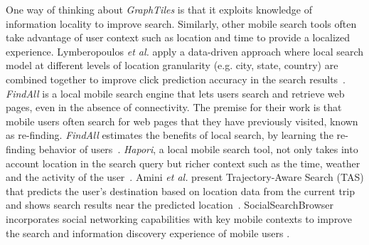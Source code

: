 


One way of thinking about \textit{GraphTiles} is that it exploits knowledge of information locality to improve search. Similarly, other mobile search tools often take advantage of user context such as location and time to provide a localized experience. Lymberopoulos \textit{et al.} apply a data-driven approach where local search model at different levels of location granularity (e.g. city, state, country) are combined together to improve click prediction accuracy in the search results~\cite{Lymberopoulos:2011}. \textit{FindAll} is a local mobile search engine that lets users search and retrieve web pages, even in the absence of connectivity. The premise for their work is that mobile users often search for web pages that they have previously visited, known as re-finding. \textit{FindAll} estimates the benefits of local search, by learning the re-finding behavior of users~\cite{Balasubramanian:2012}. \textit{Hapori}, a local mobile search tool,  not only takes into account location in the search query but richer context such as the time, weather and the activity of the user~\cite{Lane:2010}. Amini \textit{et al.} present Trajectory-Aware Search (TAS) that predicts the user's destination based on location data from the current trip and shows search results near the predicted location~\cite{Amini:2012}. SocialSearchBrowser incorporates social networking capabilities with key mobile contexts to improve the search and information discovery experience of mobile users \cite{Church:2010}.

